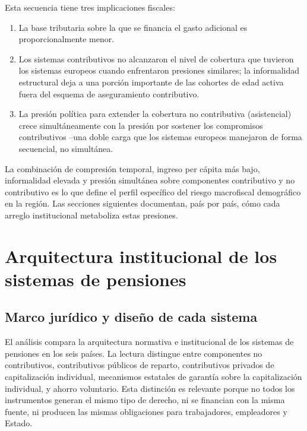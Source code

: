 \documentclass[12pt, letterpaper]{article}
\begin{document}
Esta secuencia tiene tres implicaciones fiscales:

\begin{enumerate}
  \item La base tributaria sobre la que se financia el gasto adicional es
        proporcionalmente menor.
  \item Los sistemas contributivos no alcanzaron el nivel de cobertura que tuvieron
        los sistemas europeos cuando enfrentaron presiones similares; la
        informalidad estructural deja a una porción importante de las cohortes de
        edad activa fuera del esquema de aseguramiento contributivo.
  \item La presión política para extender la cobertura no contributiva
        (asistencial) crece simultáneamente con la presión por sostener los
        compromisos contributivos --una doble carga que los sistemas europeos
        manejaron de forma secuencial, no simultánea.
\end{enumerate}

La combinación de compresión temporal, ingreso per cápita más bajo, informalidad
elevada y presión simultánea sobre componentes contributivo y no contributivo es lo
que define el perfil específico del riesgo macrofiscal demográfico en la región.
Las secciones siguientes documentan, país por país, cómo cada arreglo institucional
metaboliza estas presiones.

\newpage

\section{Arquitectura institucional de los sistemas de pensiones}
\label{sec:pensiones}

\subsection{Marco jurídico y diseño de cada sistema}
\label{sec:marco-juridico}

El análisis compara la arquitectura normativa e institucional de los sistemas de pensiones en los seis países. La lectura distingue entre componentes no contributivos, contributivos públicos de reparto, contributivos privados de capitalización individual, mecanismos estatales de garantía sobre la capitalización individual, y ahorro voluntario. Esta distinción es relevante porque no todos los instrumentos generan el mismo tipo de derecho, ni se financian con la misma fuente, ni producen las mismas obligaciones para trabajadores, empleadores y Estado.
\end{document}
